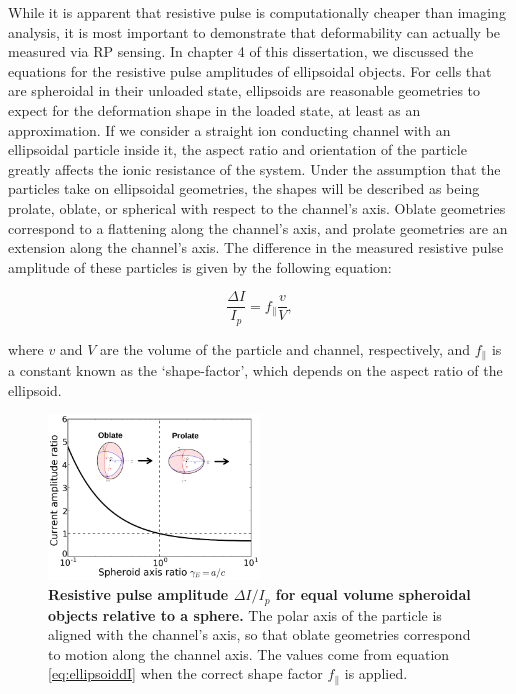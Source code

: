 		While it is apparent that resistive pulse is computationally cheaper than imaging analysis, it is most important to demonstrate that deformability can actually be measured via RP sensing. In chapter 4 of this dissertation, we discussed the equations for the resistive pulse amplitudes of ellipsoidal objects. For cells that are spheroidal in their unloaded state, ellipsoids are reasonable geometries to expect for the deformation shape in the loaded state, at least as an approximation. If we consider a straight ion conducting channel with an ellipsoidal particle inside it, the aspect ratio and orientation of the particle greatly affects the ionic resistance of the system. Under the assumption that the particles take on ellipsoidal geometries, the shapes will be described as being prolate, oblate, or spherical with respect to the channel's axis. Oblate geometries correspond to a flattening along the channel's axis, and prolate geometries are an extension along the channel's axis. The difference in the measured resistive pulse amplitude of these particles is given by the following equation:
		
		\begin{equation}\label{eq:ellipsoiddI}
			\frac{\Delta I}{I_{p}}=f_{\parallel}\frac{v}{V},
		\end{equation}
		
		where $v$ and $V$ are the volume of the particle and channel, respectively, and $f_{\parallel}$ is a constant known as the `shape-factor', which depends on the aspect ratio of the ellipsoid. 
		
		\begin{figure}
			\includegraphics[width=0.5\textwidth]{dIellipsoid.png}
			\caption{\textbf{Resistive pulse amplitude $\Delta I/I_{p}$ for equal volume spheroidal objects relative to a sphere.} The polar axis of the particle is aligned with the channel's axis, so that oblate geometries correspond to motion along the channel axis. The values come from equation \ref{eq:ellipsoiddI} when the correct shape factor $f_{\parallel}$ is applied.}
		\end{figure}

